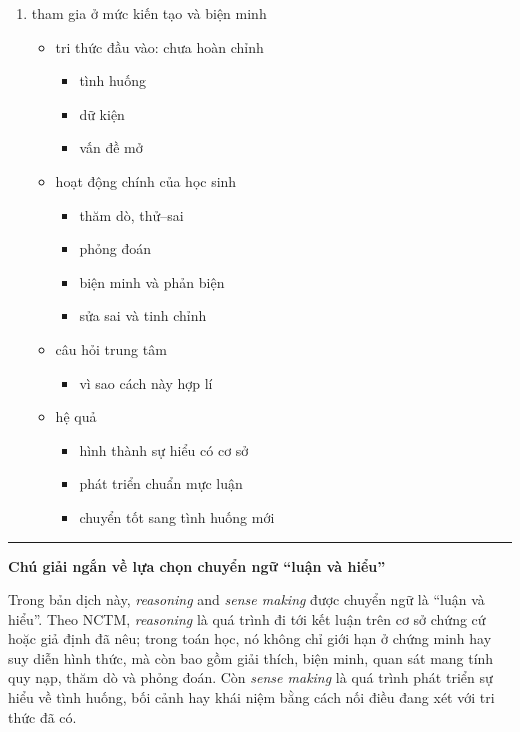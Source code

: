 {{\begin{enumerate}
    \item tham gia ở mức kiến tạo và biện minh
      \begin{itemize}
        \item tri thức đầu vào: chưa hoàn chỉnh
          \begin{itemize}
            \item tình huống
            \item dữ kiện
            \item vấn đề mở
          \end{itemize}
        \item hoạt động chính của học sinh
          \begin{itemize}
            \item thăm dò, thử--sai
            \item phỏng đoán
            \item biện minh và phản biện
            \item sửa sai và tinh chỉnh
          \end{itemize}
        \item câu hỏi trung tâm
          \begin{itemize}
            \item vì sao cách này hợp lí
          \end{itemize}
        \item hệ quả
          \begin{itemize}
            \item hình thành sự hiểu có cơ sở
            \item phát triển chuẩn mực luận
            \item chuyển tốt sang tình huống mới
          \end{itemize}
      \end{itemize}
  \end{enumerate}

  \noindent\rule{\linewidth}{0.4pt}

  \noindent\textbf{Chú giải ngắn về lựa chọn chuyển ngữ ``luận và hiểu''}\vspace{.25\baselineskip}

  Trong bản dịch này, \emph{reasoning} and \emph{sense making} được chuyển ngữ là ``luận và hiểu''. Theo NCTM, \emph{reasoning} là quá trình đi tới kết luận trên cơ sở chứng cứ hoặc giả định đã nêu; trong toán học, nó không chỉ giới hạn ở chứng minh hay suy diễn hình thức, mà còn bao gồm giải thích, biện minh, quan sát mang tính quy nạp, thăm dò và phỏng đoán. Còn \emph{sense making} là quá trình phát triển sự hiểu về tình huống, bối cảnh hay khái niệm bằng cách nối điều đang xét với tri thức đã có.

}}
